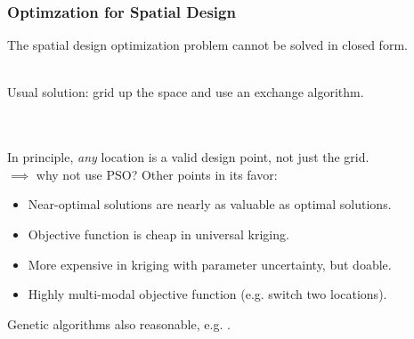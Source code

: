 \documentclass[xcolor=dvipsnames]{beamer}
\begin{document}
\begin{frame}
  \frametitle{Optimzation for Spatial Design}
  The spatial design optimization problem cannot be solved in closed form. \\~\\ \pause

  Usual solution: grid up the space and use an exchange algorithm.\\
 \citep*{nychka1998design,wikle1999space,wikle2005dynamic} \\~\\ \pause

  In principle, \emph{any} location is a valid design point, not just the grid.\\
  $\implies$ why not use PSO? \pause Other points in its favor: \\
  \begin{itemize}
  \item Near-optimal solutions are nearly as valuable as optimal solutions.
  \item Objective function is cheap in universal kriging.
  \item More expensive in kriging with parameter uncertainty, but doable.
  \item Highly multi-modal objective function (e.g. switch two locations).\pause
  \end{itemize}

  Genetic algorithms also reasonable, e.g. \citet*{hamada2001finding}.
\end{frame}
\end{document}
